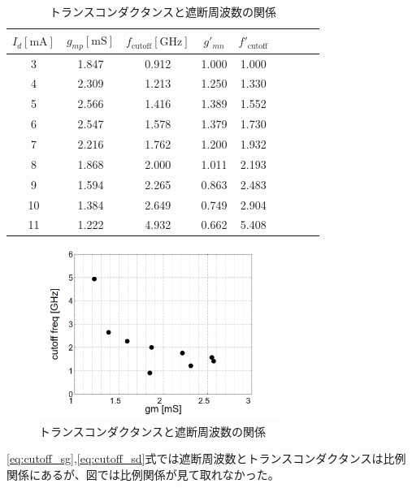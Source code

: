 \documentclass[twocolumn]{jsarticle}
\begin{document}
    \begin{table}[!h]
        \caption{トランスコンダクタンスと遮断周波数の関係}
        \label{table:gm_cutoff}
        \centering
        \begin{tabular}{ccccccccc}
            $I_{d}[\mathrm{mA}]$ & $g_{mp}[\mathrm{mS}]$ & $f_{\mathrm{cutoff}}[\mathrm{GHz}]$ &$g\prime_{mn}$ & $f\prime_{\mathrm{cutoff}}$\\
            \hline\hline
            3 & 1.847 & 0.912 & 1.000 & 1.000\\
            4 & 2.309 & 1.213 & 1.250 & 1.330\\
            5 & 2.566 & 1.416 & 1.389 & 1.552\\
            6 & 2.547 & 1.578 & 1.379 & 1.730\\
            7 & 2.216 & 1.762 & 1.200 & 1.932\\
            8 & 1.868 & 2.000 & 1.011 & 2.193\\
            9 & 1.594 & 2.265 & 0.863 & 2.483\\
            10 & 1.384 & 2.649 & 0.749 & 2.904\\
            11 & 1.222 & 4.932 & 0.662 & 5.408
        \end{tabular}
    \end{table}

    \begin{figure}[!h]
        \begin{center}
            \includegraphics*[width=80mm]{graphes/bitmap/gmp_cutoff.PNG}
            \caption{トランスコンダクタンスと遮断周波数の関係}
            \label{fig:gm_cutoff}
        \end{center}
    \end{figure}

    \newpage

    \eqref{eq:cutoff_sg},\eqref{eq:cutoff_sd}式では遮断周波数とトランスコンダクタンスは比例関係にあるが、図では比例関係が見て取れなかった。    
\end{document}
